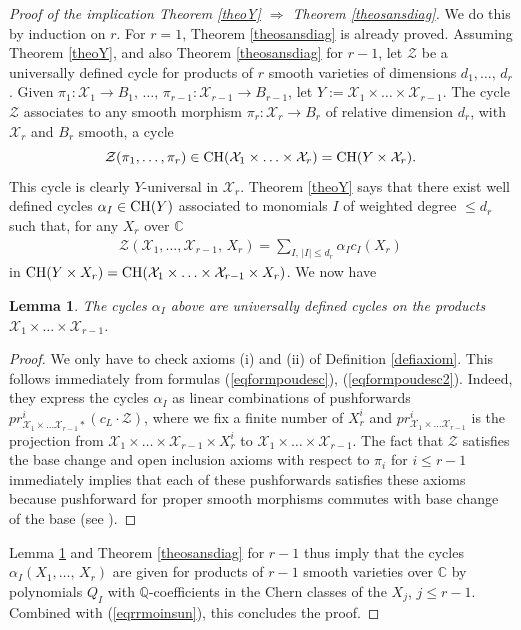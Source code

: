 \documentclass[10pt]{article}
\newtheorem{lemm}[theo]{Lemma}
\begin{document}
 \begin{proof}[Proof of the implication Theorem \ref{theoY} $\Rightarrow$  Theorem \ref{theosansdiag}]  We do this by induction on $r$. For $r=1$,  Theorem \ref{theosansdiag} is already proved.
Assuming Theorem
\ref{theoY}, and  also Theorem \ref{theosansdiag}   for $r-1$, let $\mathcal{Z}$ be a universally defined cycle for products of $r$ smooth varieties of dimensions $d_1,\ldots,\, d_r$.
Given $\pi_1:\mathcal{X}_1\rightarrow B_1,\,\ldots,\,\pi_{r-1}:\mathcal{X}_{r-1}\rightarrow B_{r-1}$, let
$Y:=\mathcal{X}_1\times\ldots\times \mathcal{X}_{r-1}$. The cycle $\mathcal{Z}$ associates to
any  smooth morphism $\pi_r:\mathcal{X}_r\rightarrow B_r$ of relative dimension $d_r$, with $\mathcal{X}_r$ and $B_r$ smooth, a cycle
$$\mathcal{Z}(\pi_1,\ldots,\pi_r)\in {\rm CH}(\mathcal{X}_1\times\ldots\times\mathcal{X}_r)=
{\rm CH}(Y\times\mathcal{X}_r).$$
This cycle is clearly $Y$-universal in $\mathcal{X}_r$.
Theorem \ref{theoY} says that
there exist well defined cycles $\alpha_I\in {\rm CH}(Y)$ associated to monomials
$I$ of weighted degree $\leq d_r$ such that, for any $X_r$ over $\mathbb{C}$
\begin{eqnarray}
\label{eqrrmoinsun} \mathcal{Z}(\mathcal{X}_1,\ldots,\mathcal{X}_{r-1},\,X_r)=\sum_{I,\,|I|\leq d_r}\alpha_I c_I(X_r)
\end{eqnarray}
in
${\rm CH}(Y\times {X}_r)= {\rm CH}(\mathcal{X}_1\times \ldots\times \mathcal{X}_{r-1}\times {X}_r)$.
We now have
\begin{lemm} \label{leunirmoins1} The cycles $\alpha_I$ above are universally defined cycles on the products
$\mathcal{X}_1\times\ldots\times \mathcal{X}_{r-1}$.
\end{lemm}
\begin{proof} We only have to check axioms (i) and (ii) of Definition
\ref{defiaxiom}. This follows immediately from formulas (\ref{eqformpoudesc}), (\ref{eqformpoudesc2}). Indeed, they express the cycles $\alpha_I$ as linear combinations
of pushforwards $pr^i_{\mathcal{X}_1\times\ldots \mathcal{X}_{r-1}*}(c_L\cdot \mathcal{Z})$,
where we fix a finite number of $X_r^i$ and $pr^i_{\mathcal{X}_1\times\ldots \mathcal{X}_{r-1}}$
is the projection from $\mathcal{X}_1\times\ldots\times  \mathcal{X}_{r-1}\times X_r^i$ to
$\mathcal{X}_1\times\ldots\times  \mathcal{X}_{r-1}$. The fact that $\mathcal{Z}$ satisfies the
base change and open inclusion axioms with respect to $\pi_i$ for $i\leq r-1$ immediately implies that each of these pushforwards satisfies these axioms because pushforward for
proper smooth morphisms commutes with base change of the base (see \cite[Proposition 1.7]{fulton}).
\end{proof}
Lemma \ref{leunirmoins1} and Theorem \ref{theosansdiag}   for $r-1$   thus imply that
the  cycles $\alpha_I(X_1,\ldots,\, X_r)$  are given for products of $r-1$ smooth varieties over $\mathbb{C}$ by polynomials
$Q_I$ with $\mathbb{Q}$-coefficients  in the Chern classes of the $X_j$, $j\leq r-1$.
Combined with (\ref{eqrrmoinsun}), this  concludes the proof.
\end{proof}
\end{document}
